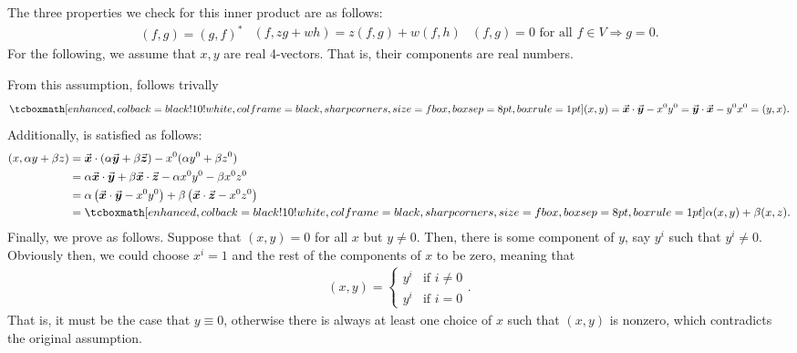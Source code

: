 
The three properties we check for this inner product are as follows:
\begin{subequations} 
\begin{eqnarray}
    \label{eq:prop-1}
    (f,g) = (g,f)^{*}
\end{eqnarray}
\begin{eqnarray}
    \label{eq:prop-2}
    (f,zg+wh) = z(f,g) + w(f,h)
\end{eqnarray}
\begin{eqnarray}
    \label{eq:prop-3}
    (f,g) = 0 \mbox{ for all } f \in V \Rightarrow g = 0
.\end{eqnarray}
\end{subequations}
For the following, we assume that $x,y$ are real 4-vectors.
That is, their components are real numbers.

From this assumption,  follows trivally
\begin{eqnarray}
    \label{eq:prop-1-mink}
    \eqbox{
    (x,y) = \va*{x} \cdot \va*{y} - x^{0}y^{0} = \va*{y} \cdot \va*{x} - y^{0}x^{0} = (y,x) 
    }
.\end{eqnarray}
Additionally,  is satisfied as follows:
\begin{align}
    \label{eq:prop-2-mink}
    (x,\alpha y + \beta z) &= \va*{x} \cdot (\alpha \va*{y} + \beta \va*{z}) - x^{0}(\alpha y^{0} + \beta z^{0}) \notag \\
                           &= \alpha \va*{x} \cdot \va*{y} + \beta \va*{x} \cdot \va*{z} - \alpha x^{0}y^{0} - \beta x^{0}z^{0} \notag \\
                           &= \alpha \left( \va*{x} \cdot \va*{y} - x^{0}y^{0} \right) + \beta \left( \va*{x} \cdot \va*{z} - x^{0} z^{0} \right) \notag \\
                           &= \eqbox{\alpha (x,y) + \beta (x,z)}
.\end{align}
Finally, we prove  as follows.
Suppose that $(x,y) = 0$ for all $x$ but $y \ne 0$.
Then, there is some component of $y$, say $y^{i}$ such that $y^{i} \ne 0$.
Obviously then, we could choose $x^{i} = 1$ and the rest of the components of $x$ to be zero, meaning that 
\begin{eqnarray}
    \label{eq:prod-3-mink}
    (x,y) = \begin{cases}
        y^{i} & \mbox{if } i \ne 0 \\
        y^{i} & \mbox{if } i = 0
    \end{cases}
.\end{eqnarray}
That is, it must be the case that $y \equiv 0$, otherwise there is always at least one choice of $x$ such that $(x,y)$ is nonzero, which contradicts the original assumption.


